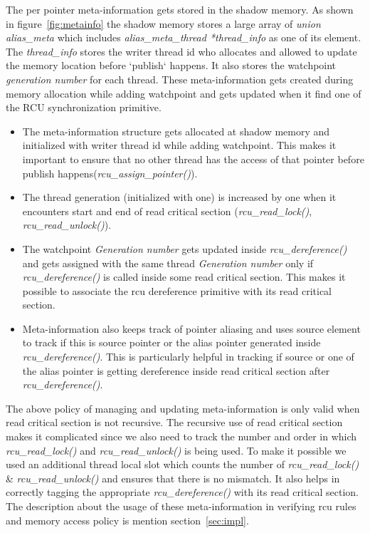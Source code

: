 The per pointer meta-information gets stored in the shadow memory. As shown in figure~\ref{fig:metainfo} the shadow memory stores a large array of \emph{union alias\_meta} which includes \emph{ alias\_meta\_thread *thread\_info} as one of its element. The \emph{thread\_info} stores the writer thread id who allocates and allowed to update the memory location before `publish` happens. It also stores the watchpoint \emph{generation number} for each thread. These meta-information gets created during memory allocation while adding watchpoint and gets updated when it find one of the RCU synchronization primitive. 

\begin{itemize}
    	\item	The meta-information structure gets allocated at shadow memory and initialized with writer thread id while adding watchpoint. This makes it important to ensure that no other thread has the access of that pointer before publish happens(\emph{rcu\_assign\_pointer()}). 
    	\item 	The thread generation (initialized with one) is increased by one when it encounters start and end of read critical section (\emph{rcu\_read\_lock()}, \emph{rcu\_read\_unlock()}).  
	\item 	The watchpoint \emph{Generation number} gets updated inside \emph{rcu\_dereference()} and gets assigned with the same thread \emph{Generation number} only if \emph{rcu\_dereference()} is called inside some read critical section. This makes it possible to associate the rcu dereference primitive with its read critical section.
	\item 	Meta-information also keeps track of pointer aliasing and uses source element to track if this is source pointer or the alias pointer generated inside \emph{rcu\_dereference()}. This is particularly helpful in tracking if source or one of the alias pointer is getting dereference inside read critical section after \emph{rcu\_dereference()}.
\end{itemize}

The above policy of managing and updating meta-information is only valid when read critical section is not recursive. The recursive use of read critical section makes it complicated since we also need to track the number and order in which \emph{rcu\_read\_lock()} and \emph{rcu\_read\_unlock()} is being used. To make it possible we used an additional thread local slot which counts the number of \emph{rcu\_read\_lock()} \& \emph{rcu\_read\_unlock()} and ensures that there is no mismatch. It also helps in correctly tagging the appropriate \emph{rcu\_dereference()} with its read critical section. The description about the usage of these meta-information in verifying rcu rules and memory access policy is mention section~\ref{sec:impl}. 

